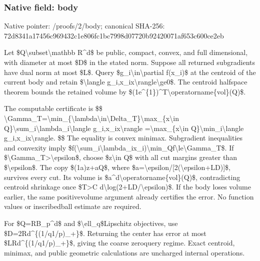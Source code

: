 \documentclass[10pt,a4paper]{article}
\begin{document}
\subsubsection{Native field: body}


Native pointer: /proofs/2/body; canonical SHA-256: 72d8341a17456c969432c1e8\allowbreak{}06fc1bc7998d07720b924200\allowbreak{}71af653c600ce2eb


Let \$Q\textbackslash{}subset\textbackslash{}mathbb R\textasciicircum{}d\$ be public, compact, convex, and full dimensional, with diameter at most \$D\$ in the stated norm. Suppose all returned subgradients have dual norm at most \$L\$. Query \$g\_i\textbackslash{}in\textbackslash{}partial f(x\_i)\$ at the centroid of the current body and retain \$\textbackslash{}langle g\_i,x\_ix\textbackslash{}rangle\textbackslash{}ge0\$. The centroid halfspace theorem bounds the retained volume by \$(1e\textasciicircum{}\{1\})\textasciicircum{}T\textbackslash{}operatorname\{vol\}(Q)\$.

The computable certificate is
\$\$
\textbackslash{}Gamma\_T=\textbackslash{}min\_\{\textbackslash{}lambda\textbackslash{}i\allowbreak{}n\textbackslash{}Delta\_T\}\textbackslash{}max\_\{x\textbackslash{}in Q\}\textbackslash{}sum\_i\textbackslash{}lambda\_i\textbackslash{}langle g\_i,x\_ix\textbackslash{}rangle
=\textbackslash{}max\_\{x\textbackslash{}in Q\}\textbackslash{}min\_i\textbackslash{}langle g\_i,x\_ix\textbackslash{}rangle.
\$\$
The equality is convex minimax. Subgradient inequalities and convexity imply
\$f(\textbackslash{}sum\_i\textbackslash{}lambda\_ix\_i)\textbackslash{}\allowbreak{}min\_Qf\textbackslash{}le\textbackslash{}Gamma\_T\$.
If \$\textbackslash{}Gamma\_T>\textbackslash{}epsilon\$, choose \$z\textbackslash{}in Q\$ with all cut margins greater than \$\textbackslash{}epsilon\$. The copy \$(1a)z+aQ\$, where \$a=\textbackslash{}epsilon/[2(\textbackslash{}epsilon+LD)]\$, survives every cut. Its volume is \$a\textasciicircum{}d\textbackslash{}operatorname\{vol\}(Q)\$, contradicting centroid shrinkage once \$T>C d\textbackslash{}log(2+LD/\textbackslash{}epsilon)\$. If the body loses volume earlier, the same positivevolume argument already certifies the error. No function values or inscribedball estimate are required.

For \$Q=RB\_p\textasciicircum{}d\$ and \$\textbackslash{}ell\_q\$Lipschitz objectives, use \$D=2Rd\textasciicircum{}\{(1/q1/p)\_+\}\$. Returning the center has error at most \$LRd\textasciicircum{}\{(1/q1/p)\_+\}\$, giving the coarse zeroquery regime. Exact centroid, minimax, and public geometric calculations are uncharged internal operations.
\end{document}

